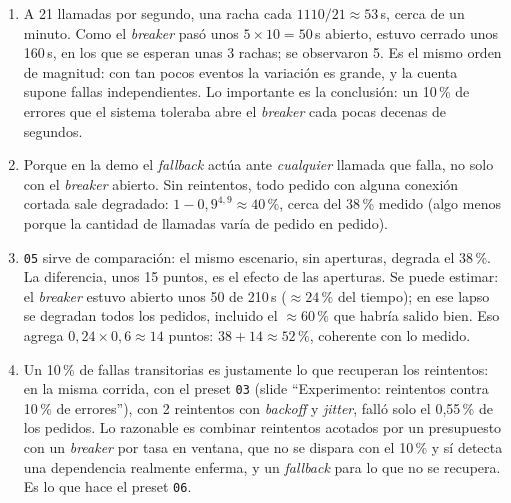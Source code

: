 \documentclass[variant=guia,cover=institutional,mode=screen]{ua-engineering-v6-article}
\begin{document}
\begin{uaanswer}
\begin{enumerate}
\item A 21 llamadas por segundo, una racha cada $1110 / 21 \approx 53$\,s, cerca de un minuto. Como el \emph{breaker} pasó unos $5 \times 10 = 50$\,s abierto, estuvo cerrado unos 160\,s, en los que se esperan unas 3 rachas; se observaron 5. Es el mismo orden de magnitud: con tan pocos eventos la variación es grande, y la cuenta supone fallas independientes. Lo importante es la conclusión: un 10\,\% de errores que el sistema toleraba abre el \emph{breaker} cada pocas decenas de segundos.
\item Porque en la demo el \emph{fallback} actúa ante \emph{cualquier} llamada que falla, no solo con el \emph{breaker} abierto. Sin reintentos, todo pedido con alguna conexión cortada sale degradado: $1 - 0{,}9^{4{,}9} \approx 40\,\%$, cerca del 38\,\% medido (algo menos porque la cantidad de llamadas varía de pedido en pedido).
\item \texttt{05} sirve de comparación: el mismo escenario, sin aperturas, degrada el 38\,\%. La diferencia, unos 15 puntos, es el efecto de las aperturas. Se puede estimar: el \emph{breaker} estuvo abierto unos 50 de 210\,s ($\approx 24\,\%$ del tiempo); en ese lapso se degradan todos los pedidos, incluido el $\approx 60\,\%$ que habría salido bien. Eso agrega $0{,}24 \times 0{,}6 \approx 14$ puntos: $38 + 14 \approx 52\,\%$, coherente con lo medido.
\item Un 10\,\% de fallas transitorias es justamente lo que recuperan los reintentos: en la misma corrida, con el preset \texttt{03} (slide ``Experimento: reintentos contra 10\,\% de errores''), con 2 reintentos con \emph{backoff} y \emph{jitter}, falló solo el 0,55\,\% de los pedidos. Lo razonable es combinar reintentos acotados por un presupuesto con un \emph{breaker} por tasa en ventana, que no se dispara con el 10\,\% y sí detecta una dependencia realmente enferma, y un \emph{fallback} para lo que no se recupera. Es lo que hace el preset \texttt{06}.
\end{enumerate}
\end{uaanswer}
\end{document}
